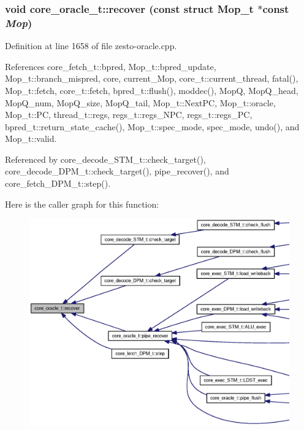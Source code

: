 \subsubsection[{recover}]{\setlength{\rightskip}{0pt plus 5cm}void core\_\-oracle\_\-t::recover (const struct {\bf Mop\_\-t} $\ast$const  {\em Mop})}\label{classcore__oracle__t_3262388e107011060f8fe40023f235c5}




Definition at line 1658 of file zesto-oracle.cpp.

References core\_\-fetch\_\-t::bpred, Mop\_\-t::bpred\_\-update, Mop\_\-t::branch\_\-mispred, core, current\_\-Mop, core\_\-t::current\_\-thread, fatal(), Mop\_\-t::fetch, core\_\-t::fetch, bpred\_\-t::flush(), moddec(), MopQ, MopQ\_\-head, MopQ\_\-num, MopQ\_\-size, MopQ\_\-tail, Mop\_\-t::NextPC, Mop\_\-t::oracle, Mop\_\-t::PC, thread\_\-t::regs, regs\_\-t::regs\_\-NPC, regs\_\-t::regs\_\-PC, bpred\_\-t::return\_\-state\_\-cache(), Mop\_\-t::spec\_\-mode, spec\_\-mode, undo(), and Mop\_\-t::valid.

Referenced by core\_\-decode\_\-STM\_\-t::check\_\-target(), core\_\-decode\_\-DPM\_\-t::check\_\-target(), pipe\_\-recover(), and core\_\-fetch\_\-DPM\_\-t::step().

Here is the caller graph for this function:\nopagebreak
\begin{figure}[H]
\begin{center}
\leavevmode
\includegraphics[width=420pt]{classcore__oracle__t_3262388e107011060f8fe40023f235c5_icgraph}
\end{center}
\end{figure}
